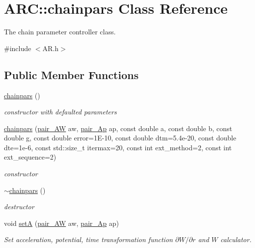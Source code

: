 \hypertarget{classARC_1_1chainpars}{}\section{A\+RC\+:\+:chainpars Class Reference}
\label{classARC_1_1chainpars}


The chain parameter controller class.  




{\ttfamily \#include $<$A\+R.\+h$>$}

\subsection*{Public Member Functions}
\begin{DoxyCompactItemize}
\item 
\hyperlink{classARC_1_1chainpars_a2019a609d85e2b801f306ac8c7f268ab}{chainpars} ()
\begin{DoxyCompactList}\small\item\em constructor with defaulted parameters \end{DoxyCompactList}\item 
\hyperlink{classARC_1_1chainpars_a6ae47a82b6c68f80015cec4eb51fd1c4}{chainpars} (\hyperlink{namespaceARC_a5c4308ca4a8d0e0ff59fdce30f00274c}{pair\+\_\+\+AW} aw, \hyperlink{namespaceARC_a819446c4644b3a3af7ef11574d0b55e0}{pair\+\_\+\+Ap} ap, const double a, const double b, const double g, const double error=1\+E-\/10, const double dtm=5.\+4e-\/20, const double dte=1e-\/6, const std\+::size\+\_\+t itermax=20, const int ext\+\_\+method=2, const int ext\+\_\+sequence=2)
\begin{DoxyCompactList}\small\item\em constructor \end{DoxyCompactList}\item 
\hyperlink{classARC_1_1chainpars_a032873f782645efb6e60dc77f6d425dc}{$\sim$chainpars} ()
\begin{DoxyCompactList}\small\item\em destructor \end{DoxyCompactList}\item 
void \hyperlink{classARC_1_1chainpars_af639f7bc8cfbb2a0330f079df2fd556e}{setA} (\hyperlink{namespaceARC_a5c4308ca4a8d0e0ff59fdce30f00274c}{pair\+\_\+\+AW} aw, \hyperlink{namespaceARC_a819446c4644b3a3af7ef11574d0b55e0}{pair\+\_\+\+Ap} ap)
\begin{DoxyCompactList}\small\item\em Set acceleration, potential, time transformation function $\partial W/\partial r$ and $W$ calculator. \end{DoxyCompactList}\item 

\end{DoxyCompactItemize}
